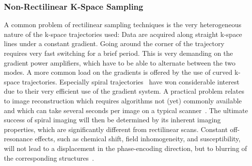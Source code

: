 \subsubsection{Non-Rectilinear K-Space Sampling}
A common problem of rectilinear sampling techniques is the very heterogeneous nature of the k-space trajectories used: Data are acquired along straight k-space lines under a constant gradient. Going around the corner of the trajectory requires very fast switching for a brief period. 
This 
is very demanding on the gradient power amplifiers, which have to be able to alternate between the two modes. A more common load on the gradients is offered by the use of curved k-space trajectories. Especially spiral trajectories~\cite{SpiralMRI, SpiralMRI2} have won considerable interest due to their very efficient use of the gradient system. 
A practical problem relates to image reconstruction which requires algorithms not (yet) commonly available and which can take several seconds per image on a typical scanner~\cite{SamplingStrategies}. 
The ultimate success of spiral imaging will then be determined by its inherent imaging properties, which are significantly different from rectilinear scans. Constant off-resonance effects, such as chemical shift, field inhomogeneity, and susceptibility, will not lead to a displacement in the phase-encoding direction, but to blurring of the corresponding structures~\cite{SamplingStrategies}.

